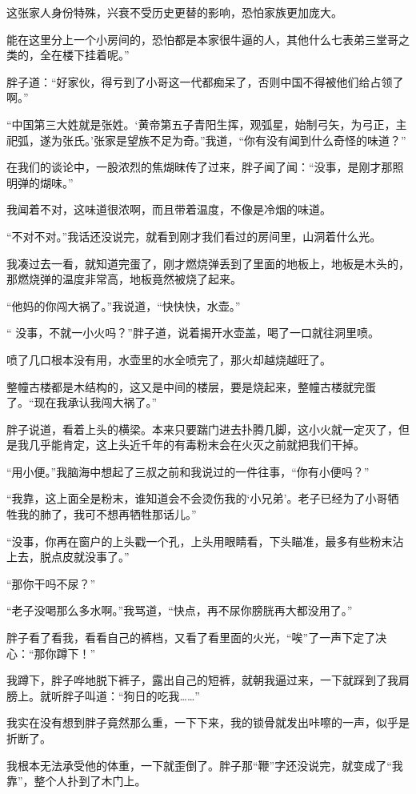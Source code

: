 这张家人身份特殊，兴衰不受历史更替的影响，恐怕家族更加庞大。

能在这里分上一个小房间的，恐怕都是本家很牛逼的人，其他什么七表弟三堂哥之类的，全在楼下挂着呢。”

胖子道：“好家伙，得亏到了小哥这一代都痴呆了，否则中国不得被他们给占领了啊。”

“中国第三大姓就是张姓。‘黄帝第五子青阳生挥，观弧星，始制弓矢，为弓正，主祀弧，遂为张氏。’张家是望族不足为奇。”我道，“你有没有闻到什么奇怪的味道？”

在我们的谈论中，一股浓烈的焦煳昧传了过来，胖子闻了闻：“没事，是刚才那照明弹的煳味。”

我闻着不对，这味道很浓啊，而且带着温度，不像是冷烟的味道。

“不对不对。”我话还没说完，就看到刚才我们看过的房间里，山洞着什么光。

我凑过去一看，就知道完蛋了，刚才燃烧弹丢到了里面的地板上，地板是木头的，那燃烧弹的温度非常高，地板竟然被烧了起来。

“他妈的你闯大祸了。”我说道，“快快快，水壶。”

“ 没事，不就一小火吗？”胖子道，说着揭开水壶盖，喝了一口就往洞里喷。

喷了几口根本没有用，水壶里的水全喷完了，那火却越烧越旺了。

整幢古楼都是木结构的，这又是中间的楼层，要是烧起来，整幢古楼就完蛋了。“现在我承认我闯大祸了。”

胖子说道，看着上头的横梁。本来只要踹门进去扑腾几脚，这小火就一定灭了，但是我几乎能肯定，这上头近千年的有毒粉末会在火灭之前就把我们干掉。

“用小便。”我脑海中想起了三叔之前和我说过的一件往事，“你有小便吗？”

“我靠，这上面全是粉末，谁知道会不会烫伤我的‘小兄弟’。老子已经为了小哥牺牲我的肺了，我可不想再牺牲那话儿。”

“没事，你再在窗户的上头戳一个孔，上头用眼睛看，下头瞄准，最多有些粉末沾上去，脱点皮就没事了。”

“那你干吗不尿？”

“老子没喝那么多水啊。”我骂道，“快点，再不尿你膀胱再大都没用了。”

胖子看了看我，看看自己的裤档，又看了看里面的火光，“唉”了一声下定了决心：“那你蹲下！”

我蹲下，胖子哗地脱下裤子，露出自己的短裤，就朝我逼过来，一下就踩到了我肩膀上。就听胖子叫道：“狗日的吃我……”

我实在没有想到胖子竟然那么重，一下下来，我的锁骨就发出咔嚓的一声，似乎是折断了。

我根本无法承受他的体重，一下就歪倒了。胖子那“鞭”字还没说完，就变成了“我靠”，整个人扑到了木门上。

